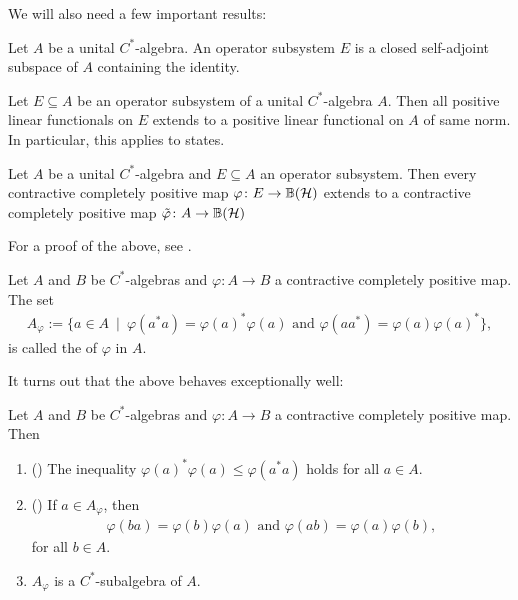We will also need a few important results:
\begin{definition}
	Let $A$ be a unital $C^*$-algebra. An operator subsystem $E$ is a closed self-adjoint subspace of $A$ containing the identity.
\end{definition}
\begin{lemma}
Let $E \subseteq A$ be an operator subsystem of a unital $C^*$-algebra $A$. Then all positive linear functionals on $E$ extends to a positive linear functional on $A$ of same norm. In particular, this applies to states.
\end{lemma}
\begin{theorem}
	Let $A$ be a unital $C^*$-algebra and $E \subseteq A$ an operator subsystem. Then every contractive completely positive map $\varphi \colon E \to \mathbb{B}(\mathcal{H})$ extends to a contractive completely positive map $\tilde \varphi \colon A \to \mathbb{B}(\mathcal{H})$
\end{theorem}
For a proof of the above, see \cite[Theorem 1.6.1]{brown2008c}.
\begin{definition}
	Let $A$ and $B$ be $C^*$-algebras and $\varphi \colon A \to B$ a contractive completely positive map. The set
	\begin{align*}
		A_\varphi := \{a \in A \ \mid \ \varphi(a^*a)=\varphi(a)^*\varphi(a) \text{ and } \varphi(a a^*) = \varphi(a) \varphi(a)^*\},
	\end{align*}
	is called the  of $\varphi$ in $A$.
\end{definition}
It turns out that the above behaves exceptionally well:
\begin{proposition}	
	Let $A$ and $B$ be $C^*$-algebras and $\varphi \colon A \to B$ a contractive completely positive map. Then
	\begin{enumerate}
		\item () The inequality $\varphi(a)^*\varphi(a) \leq \varphi(a^*a)$ holds for all $a \in A$.
		\item() If $a \in A_\varphi$, then
			\begin{align*}
				\varphi(ba)=\varphi(b)\varphi(a) \text{ and } \varphi(ab)=\varphi(a)\varphi(b),
			\end{align*}
			for all $b \in A$.
		\item $A_\varphi$ is a $C^*$-subalgebra of $A$.
	\end{enumerate}
\end{proposition}
